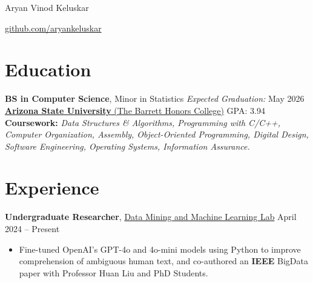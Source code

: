 \documentclass[11pt]{article}       %
\begin{document}
\centerline{\Huge Aryan Vinod Keluskar}

\vspace{5pt}

\centerline{  \color{black}{|}  \color{blue} \href{https://www.github.com/aryankeluskar}{github.com/aryankeluskar}  
}

\vspace{-10pt}


\section*{Education}

\textbf{BS in Computer Science}, Minor in Statistics \hfill \textit{Expected Graduation:} May 2026 \\
 \href{https://barretthonors.asu.edu/}{\textbf{Arizona State University} (The Barrett Honors College)} \hfill GPA: 3.94  \\
\textbf{Coursework:} \textit{Data Structures \& Algorithms, Programming with C/C++, Computer Organization, Assembly, Object-Oriented Programming, Digital Design, Software Engineering, Operating Systems, Information Assurance.}

\vspace{-6.5pt}


\section*{Experience}

\textbf{Undergraduate Researcher}, \href{https://dmml.asu.edu/}{Data Mining and Machine Learning Lab} \hfill April 2024 -- Present \\
\vspace{-5pt}
\begin{itemize}
\item Fine-tuned OpenAI's GPT-4o and 4o-mini models using Python to improve comprehension of ambiguous human text, and co-authored an \textbf{IEEE} BigData paper with Professor Huan Liu and PhD Students.
\end{itemize}
\end{document}
